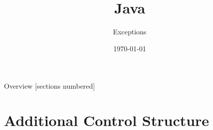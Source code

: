 


\usepackage{qtree}

\title{Java}
\subtitle{Exceptions}
\date{\today}


	
	\begin{frame}
		\titlepage
	\end{frame}
	\begin{frame}{Overview}
		[sections numbered]
		\tableofcontents
	\end{frame}

\section{Additional Control Structure}
